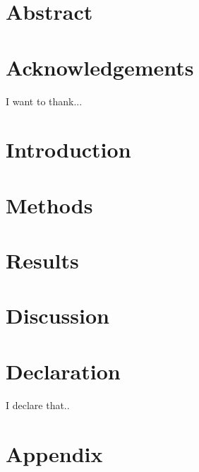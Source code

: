 \documentclass[12pt, twoside]{report}
\begin{document}


\chapter*{Abstract}


\chapter*{Acknowledgements}
I want to thank...

\tableofcontents
\listoffigures
\listoftables
\chapter{Introduction}
\label{chapter01}


\chapter{Methods}
\label{chapter02}


\chapter{Results}
\label{chapter03}


\chapter{Discussion}
\label{chapter04}


\chapter*{Declaration}
I declare that..

\appendix
\chapter{Appendix}

\printbibliography
\end{document}
